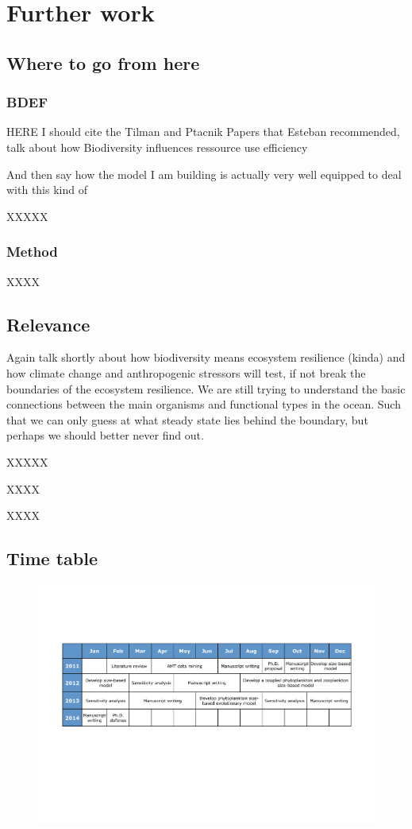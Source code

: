\chapter {Further work}

\section{Where to go from here}

\subsection{BDEF}

 HERE I should cite the Tilman and Ptacnik Papers that Esteban recommended, talk about how Biodiversity influences ressource use efficiency
 
 And then say how the model I am building is actually very well equipped to deal with this kind of 


XXXXX

\subsection{Method}
XXXX




\section{Relevance}
Again talk shortly about how biodiversity means ecosystem resilience (kinda) and how climate change and anthropogenic stressors will test, if not break the boundaries of the ecosystem resilience. We are still trying to understand the basic connections between the main organisms and functional types in the ocean. Such that we can only guess at what steady state lies behind the boundary, but perhaps we should better never find out.

XXXXX


XXXX

XXXX


\newpage

\section{Time table} 

\begin{figure}[h]
\centering
\includegraphics[trim = 20mm 25mm 20mm 25mm, clip, width=1\linewidth]{./Chp3-Further/Chronogram.pdf}
\end{figure}


